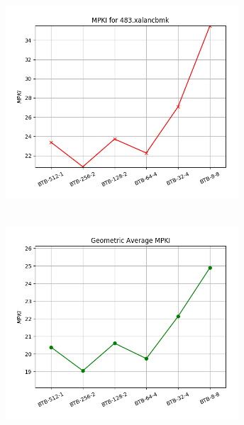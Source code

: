    \begin{minipage}{\textwidth}
      \begin{center}
         \\
         \vspace{3mm}
         \includegraphics[width=0.65\textwidth, frame]{./graphs/4-3/483-xalancbmk.png}
         \vspace{6mm}
      \end{center}
   \end{minipage}

   \begin{minipage}{\textwidth}
      \begin{center}
         \\
         \vspace{3mm}
         \includegraphics[width=0.65\textwidth, frame]{./graphs/4-3/mean.png}
         \vspace{6mm}
      \end{center}
   \end{minipage}


